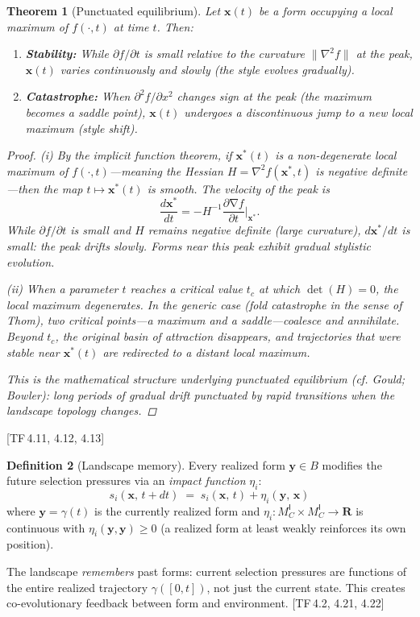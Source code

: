 \documentclass[11pt, a4paper]{article}
\theoremstyle{definition}
\newtheorem{definition}{Definition}[section]
\theoremstyle{plain}
\newtheorem{theorem}[definition]{Theorem}
\theoremstyle{remark}
\newcommand{\MC}{M^{\mathsf{I}}_C}          %
\providecommand{\R}{}
\renewcommand{\R}{\mathbf{R}}               %
\newcommand{\norm}[1]{\lVert #1 \rVert}
\DeclareMathOperator{\grad}{\nabla}
\newcommand{\TF}[1]{\textnormal{[TF\,#1]}}  %
\begin{document}
\begin{theorem}[Punctuated equilibrium]\label{thm:4.2}
Let $\bm{x}(t)$ be a form occupying a local maximum of $f(\cdot, t)$
at time $t$. Then:
\begin{enumerate}[label=(\roman*),nosep]
  \item \textbf{Stability:} While $\partial f / \partial t$ is small
    relative to the curvature $\norm{\nabla^2 f}$ at the peak,
    $\bm{x}(t)$ varies continuously and slowly (the style evolves
    gradually).
  \item \textbf{Catastrophe:} When $\partial^2 f / \partial x^2$ changes
    sign at the peak (the maximum becomes a saddle point), $\bm{x}(t)$
    undergoes a discontinuous jump to a new local maximum (style shift).
\end{enumerate}

\begin{proof}
\textit{(i)}\; By the implicit function theorem, if $\bm{x}^*(t)$ is a
non-degenerate local maximum of $f(\cdot, t)$---meaning the Hessian
$H = \nabla^2 f(\bm{x}^*, t)$ is negative definite---then the map
$t \mapsto \bm{x}^*(t)$ is smooth. The velocity of the peak is
\[
  \frac{d\bm{x}^*}{dt} = -H^{-1} \frac{\partial \grad f}{\partial t}
  \bigg|_{\bm{x}^*}.
\]
While $\partial f / \partial t$ is small and $H$ remains negative
definite (large curvature), $d\bm{x}^*/dt$ is small: the peak drifts
slowly. Forms near this peak exhibit gradual stylistic evolution.

\textit{(ii)}\; When a parameter $t$ reaches a critical value $t_c$ at
which $\det(H) = 0$, the local maximum degenerates. In the generic case
(fold catastrophe in the sense of Thom), two critical points---a maximum
and a saddle---coalesce and annihilate. Beyond $t_c$, the original basin
of attraction disappears, and trajectories that were stable near
$\bm{x}^*(t)$ are redirected to a distant local maximum.

This is the mathematical structure underlying punctuated equilibrium
(\textit{cf.} Gould; Bowler): long periods of gradual drift punctuated
by rapid transitions when the landscape topology changes. \qedhere
\end{proof}
\end{theorem}

\TF{4.11, 4.12, 4.13}

\begin{definition}[Landscape memory]\label{def:4.3}
Every realized form $\bm{y} \in B$ modifies the future selection
pressures via an \emph{impact function} $\eta_i$:
\[
  s_i(\bm{x},\, t + dt) \;=\;
  s_i(\bm{x},\, t) + \eta_i(\bm{y},\, \bm{x})
\]
where $\bm{y} = \gamma(t)$ is the currently realized form and
$\eta_i : \MC \times \MC \to \R$ is continuous with
$\eta_i(\bm{y}, \bm{y}) \geq 0$ (a realized form at least weakly
reinforces its own position).

The landscape \emph{remembers} past forms: current selection pressures
are functions of the entire realized trajectory $\gamma([0, t])$,
not just the current state. This creates co-evolutionary feedback
between form and environment. \TF{4.2, 4.21, 4.22}
\end{definition}
\end{document}
